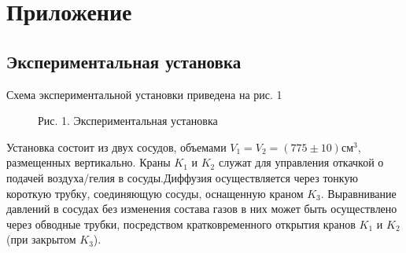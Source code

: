 \section{Приложение} \label{Приложение}

\subsection{Экспериментальная установка}
Схема экспериментальной установки приведена на рис. 1
\begin{figure}[ht]
    \begin{center}       
        Рис. 1. Экспериментальная установка
    \end{center}
\end{figure}
Установка состоит из двух сосудов, объемами $V_1=V_2=(775 \pm 10)\text{{см}}^3$, размещенных вертикально. Краны $K_1$ и $K_2$ служат для управления откачкой о подачей воздуха/гелия в сосуды.Диффузия осуществляется через тонкую короткую трубку, соединяющую сосуды, оснащенную краном $K_3$. Выравнивание давлений в сосудах без изменения состава газов в них может быть осуществлено через обводные трубки, посредством кратковременного открытия кранов $K_1$ и $K_2$ (при закрытом $K_3$).

